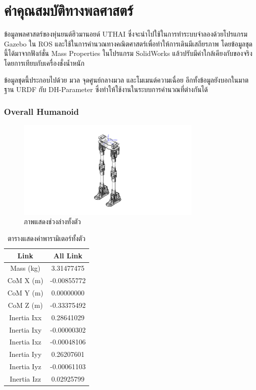 \newcommand{\addprop}[9]{
	CoM X (m) & #1\\
	CoM Y (m) & #2\\
	CoM Z (m) & #3\\
	Inertia Ixx & #4\\
	Inertia Ixy & #5\\
	Inertia Ixz & #6\\
	Inertia Iyy & #7\\
	Inertia Iyz & #8\\
	Inertia Izz & #9\\
}

\section{ค่าคุณสมบัติทางพลศาสตร์}
ข้อมูลพลศาสตร์ของหุ่นยนต์ฮิวมานอยด์ UTHAI ซึ่งจะนำไปใช้ในการทำระบบจำลองด้วยโปรแกรม Gazebo ใน ROS
และใช้ในการคำนวณทางคณิตศาสตร์เพื่อทำให้การเดินมีเสถียรภาพ
โดยข้อมูลชุดนี้ได้มาจากฟังก์ชั่น Mass Properties ในโปรแกรม SolidWorks แล้วปรับมีค่าใกล้เคียงกับของจริงโดยการเทียบกับเครื่องชั่งน้ำหนัก

ข้อมูลชุดนี้ประกอบไปด้วย มวล จุดศูนย์กลางมวล และโมเมนต์ความเฉื่อย อีกทั้งข้อมูลยังบอกในมาตฐาน URDF กับ DH-Parameter ซึ่งทำให้ใช้งานในระบบการคำนวณที่ต่างกันได้

\subsubsection*{Overall Humanoid}
\begin{figure}[!ht]
	\centering
	\includegraphics[width=0.8\textwidth]{appendix/images/uthai_dynamic_all.jpeg}
	\caption{ภาพแสดงช่วงล่างทั้งตัว}
	\label{fig:uthai_dynamic_all}
\end{figure}
\begin{table}[!ht]
	\centering
	\begin{tabular}{| c | c |}
		\hline
		Link & All Link\\
		\hline
		Mass (kg) & 3.31477475 \\
		\addprop{-0.00855772}{0.00000000}{-0.33375492}{0.28641029}{-0.00000302}{-0.00048106}{0.26207601}{-0.00061103}{0.02925799}
		\hline
	\end{tabular}
	\caption{ตารางแสดงค่าพารามิเตอร์ทั้งตัว}
	\label{tab:uthai_dynamic_all}
\end{table}


